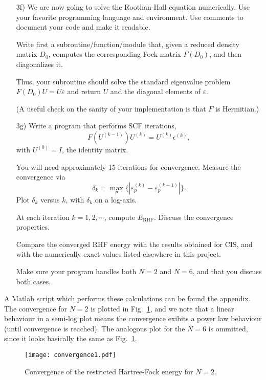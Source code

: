 \documentclass[a4paper]{article}
\newcommand{\fig}[1]{Fig.\ \ref{fig:#1}}
\begin{document}
\begin{exframe}
\begin{itemize}
  \item[3f)] We are now going to solve the Roothan-Hall equation numerically. Use your favorite programming language and environment. Use comments to document your code and make it readable.

  Write first a subroutine/function/module that, given a reduced
  density matrix $D_0$, computes the corresponding Fock matrix
  $F(D_0)$, and then diagonalizes it.

  Thus, your subroutine should solve the standard eigenvalue problem
  $F(D_0)U = U\varepsilon$ and return $U$ and the diagonal elements of
  $\varepsilon$.

  (A useful check on the sanity of your implementation is that $F$ is
  Hermitian.)
\end{itemize}
\end{exframe}
\begin{exframe}
\begin{itemize}
  \item[3g)] Write a program that performs SCF iterations,
  \begin{equation}
    F(U^{(k-1)}) U^{(k)} = U^{(k)}\epsilon^{(k)},
  \end{equation}
  with $U^{(0)}=I$, the identity matrix.

  You will need approximately 15 iterations for convergence. Measure
  the convergence via
  \begin{equation}
    \delta_k = \max_p\{|\varepsilon^{(k)}_p - \varepsilon^{(k-1)}_p|\}.
  \end{equation}
  Plot $\delta_k$ versus $k$, with $\delta_k$ on a log-axis.
  
  At each iteration $k=1,2,\cdots$, compute $E_\text{RHF}$. Discuss the
  convergence properties.

  Compare the converged RHF energy with the results obtained for CIS,
  and with the numerically exact values listed elsewhere in this project.

  Make sure your program handles both $N=2$ and $N=6$, and that you
  discuss both cases.
\end{itemize}
\end{exframe}
A {\sc Matlab} script which performs these calculations can be found the appendix. The convergence for $N=2$ is plotted in \fig{1}, and we note that a linear behaviour in a semi-log plot means the convergence exibits a power law behaviour (until convergence is reached). The analogous plot for the $N=6$ is ommitted, since it looks basically the same as \fig{1}.
\begin{figure}[h]
\centering
\texttt{[image: convergence1.pdf]}
\caption{Convergence of the restricted Hartree-Fock energy for $N=2$. \label{fig:1}}
\end{figure}
\end{document}
